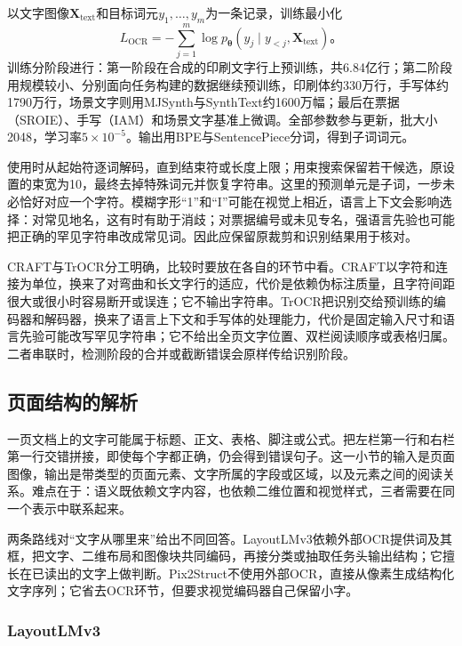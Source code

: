以文字图像$\bm X_{\mathrm{text}}$和目标词元$y_1,\ldots,y_m$为一条记录，训练最小化
\begin{equation}
  L_{\mathrm{OCR}}
  =-\sum_{j=1}^{m}\log p_{\bm\theta}
    (y_j\mid y_{<j},\bm X_{\mathrm{text}})\text{。}
  \label{eq:vision-trocr-loss}
\end{equation}
训练分阶段进行：第一阶段在合成的印刷文字行上预训练，共6.84亿行；第二阶段用规模较小、分别面向任务构建的数据继续预训练，印刷体约330万行，手写体约1790万行，场景文字则用MJSynth与SynthText约1600万幅；最后在票据（SROIE）、手写（IAM）和场景文字基准上微调。全部参数参与更新，批大小2048，学习率$5\times10^{-5}$。输出用BPE与SentencePiece分词，得到子词词元。

使用时从起始符逐词解码，直到结束符或长度上限；用束搜索保留若干候选，原设置的束宽为10，最终去掉特殊词元并恢复字符串。这里的预测单元是子词，一步未必恰好对应一个字符。模糊字形“1”和“I”可能在视觉上相近，语言上下文会影响选择：对常见地名，这有时有助于消歧；对票据编号或未见专名，强语言先验也可能把正确的罕见字符串改成常见词。因此应保留原裁剪和识别结果用于核对。

CRAFT与TrOCR分工明确，比较时要放在各自的环节中看。CRAFT以字符和连接为单位，换来了对弯曲和长文字行的适应，代价是依赖伪标注质量，且字符间距很大或很小时容易断开或误连；它不输出字符串。TrOCR把识别交给预训练的编码器和解码器，换来了语言上下文和手写体的处理能力，代价是固定输入尺寸和语言先验可能改写罕见字符串；它不给出全页文字位置、双栏阅读顺序或表格归属。二者串联时，检测阶段的合并或截断错误会原样传给识别阶段。

\subsection{页面结构的解析}
\label{sec:vision-understanding-page}

一页文档上的文字可能属于标题、正文、表格、脚注或公式。把左栏第一行和右栏第一行交错拼接，即使每个字都正确，仍会得到错误句子。这一小节的输入是页面图像，输出是带类型的页面元素、文字所属的字段或区域，以及元素之间的阅读关系。难点在于：语义既依赖文字内容，也依赖二维位置和视觉样式，三者需要在同一个表示中联系起来。

两条路线对“文字从哪里来”给出不同回答。LayoutLMv3依赖外部OCR提供词及其框，把文字、二维布局和图像块共同编码，再接分类或抽取任务头输出结构；它擅长在已读出的文字上做判断。Pix2Struct不使用外部OCR，直接从像素生成结构化文字序列；它省去OCR环节，但要求视觉编码器自己保留小字。

\subsubsection{LayoutLMv3}
\label{sec:vision-understanding-layoutlm}

